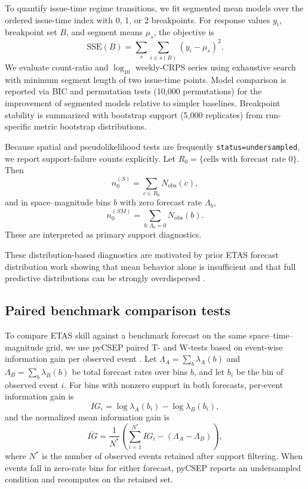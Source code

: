 \documentclass[12pt,letterpaper]{article}
\begin{document}
To quantify issue-time regime transitions, we fit segmented mean models over the
ordered issue-time index with 0, 1, or 2 breakpoints. For response values
$y_i$, breakpoint set $B$, and segment means $\mu_s$, the objective is
\begin{equation}
\mathrm{SSE}(B)=\sum_{s}\sum_{i\in s(B)} (y_i-\mu_s)^2.
\label{eq:sse_segment}
\end{equation}
We evaluate count-ratio and $\log_{10}$ weekly-CRPS series using exhaustive
search with minimum segment length of two issue-time points. Model comparison is
reported via BIC and permutation tests (10,000 permutations) for the
improvement of segmented models relative to simpler baselines. Breakpoint
stability is summarized with bootstrap support (5,000 replicates) from
run-specific metric bootstrap distributions.

Because spatial and pseudolikelihood tests are frequently
\texttt{status=undersampled}, we report support-failure counts explicitly.
Let $R_0=\{\text{cells with forecast rate }0\}$. Then
\begin{equation}
n^{(S)}_0 = \sum_{c\in R_0} N_{\mathrm{obs}}(c),
\label{eq:zero_spatial}
\end{equation}
and in space--magnitude bins $b$ with zero forecast rate $\Lambda_b$,
\begin{equation}
n^{(SM)}_0 = \sum_{b:\Lambda_b=0} N_{\mathrm{obs}}(b).
\label{eq:zero_spacemag}
\end{equation}
These are interpreted as primary support diagnostics.

These distribution-based diagnostics are motivated by prior ETAS forecast
distribution work showing that mean behavior alone is insufficient and that
full predictive distributions can be strongly overdispersed
\cite{harte2017dist,helmstetter2003,zhuang2013critical,savran2020}.

\subsection{Paired benchmark comparison tests}

To compare ETAS skill against a benchmark forecast on the same space--time--
magnitude grid, we use pyCSEP paired T- and W-tests based on event-wise
information gain per observed event \cite{savran2020}. Let
$\Lambda_A=\sum_b \lambda_A(b)$ and $\Lambda_B=\sum_b \lambda_B(b)$ be total
forecast rates over bins $b$, and let $b_i$ be the bin of observed event $i$.
For bins with nonzero support in both forecasts, per-event information gain is
\begin{equation}
IG_i = \log \lambda_A(b_i) - \log \lambda_B(b_i),
\label{eq:ig_event}
\end{equation}
and the normalized mean information gain is
\begin{equation}
\overline{IG}=
\frac{1}{N^*}\left(\sum_{i=1}^{N^*} IG_i - (\Lambda_A-\Lambda_B)\right),
\label{eq:ig_mean}
\end{equation}
where $N^*$ is the number of observed events retained after support filtering.
When events fall in zero-rate bins for either forecast, pyCSEP reports an
undersampled condition and recomputes on the retained set.
\end{document}

